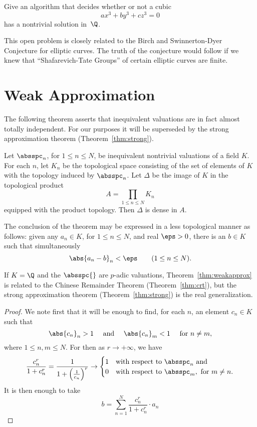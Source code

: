 \documentclass[11pt]{book}
\begin{document}
\begin{ch}
\vspace{1ex}
Give an algorithm that decides whether or not a cubic $$ax^3 + by^3 + cz^3=0$$
has a nontrivial solution in~$\Q$.
\vspace{1ex}

This open problem is closely related to the Birch and Swinnerton-Dyer
Conjecture for elliptic
curves.  The truth of the conjecture would
follow if we knew that ``Shafarevich-Tate
Groups'' of certain elliptic curves are
finite.


\section{Weak Approximation}

The following theorem asserts that inequivalent valuations are in fact
almost totally independent.  For our purposes it will be superseded by
the strong approximation theorem (Theorem~\ref{thm:strong}).

\begin{theorem}\label{thm:weakapprox}
  Let $\absspc_n$, for $1\leq n \leq N$, be inequivalent nontrivial
  valuations of a field $K$.  For each $n$, let $K_n$ be the
  topological space consisting of the set of elements of $K$ with the
  topology induced by $\absspc_n$.  Let $\Delta$ be the image of $K$
  in the topological product $$A=\prod_{1\leq n\leq N} K_n$$ equipped
  with the product topology.  Then $\Delta$ is dense in $A$.
\end{theorem}
The conclusion of the theorem may be expressed in a less topological
manner as follows: given any $a_n\in K$, for $1\leq n \leq N$, and
real $\eps>0$, there is an $b\in K$ such that simultaneously
$$
  \abs{a_n - b}_n  < \eps \qquad (1\leq n\leq N).
$$

If $K=\Q$ and the $\absspc{}$ are $p$-adic valuations,
Theorem~\ref{thm:weakapprox} is related to the Chinese Remainder
Theorem (Theorem~\ref{thm:crt}), but the strong approximation theorem
(Theorem~\ref{thm:strong}) is the
real generalization.

\begin{proof}
  We note first that it will be enough to find, for each $n$, an
  element $c_n\in K$ such that
$$
  \abs{c_n}_n > 1 \quad \text{ and } \quad \abs{c_n}_m < 1
  \quad\text{ for }n\neq m,
  $$
  where $1\leq n,m\leq N$.  For then as $r\to+\infty$, we have
$$
\frac{c_n^r}{1+c_n^r} = \frac{1}{1+\left(\frac{1}{c_n}\right)^{r}}
 \to \begin{cases} 1 & \text{with respect to } \absspc_n \text{ and }\\
                   0 & \text{with respect to } \absspc_m, \text{ for }
                   m\neq n.
     \end{cases}
     $$
  It is then enough to take
$$
   b = \sum_{n=1}^N \frac{c_n^r}{1+c_n^r} \cdot a_n
$$


\end{proof}
\end{ch}
\end{document}
